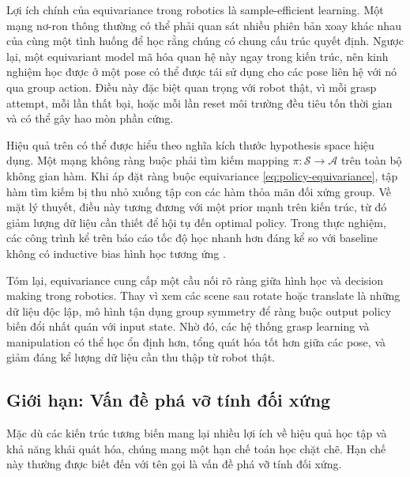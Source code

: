 
Lợi ích chính của equivariance trong robotics là sample-efficient learning. Một mạng nơ-ron thông thường có thể phải quan sát nhiều phiên bản xoay khác nhau của cùng một tình huống để học rằng chúng có chung cấu trúc quyết định. Ngược lại, một equivariant model mã hóa quan hệ này ngay trong kiến trúc, nên kinh nghiệm học được ở một pose có thể được tái sử dụng cho các pose liên hệ với nó qua group action. Điều này đặc biệt quan trọng với robot thật, vì mỗi grasp attempt, mỗi lần thất bại, hoặc mỗi lần reset môi trường đều tiêu tốn thời gian và có thể gây hao mòn phần cứng.

Hiệu quả trên có thể được hiểu theo nghĩa kích thước hypothesis space hiệu dụng. Một mạng không ràng buộc phải tìm kiếm mapping $\pi: \mathcal{S} \to \mathcal{A}$ trên toàn bộ không gian hàm. Khi áp đặt ràng buộc equivariance \eqref{eq:policy-equivariance}, tập hàm tìm kiếm bị thu nhỏ xuống tập con các hàm thỏa mãn đối xứng group. Về mặt lý thuyết, điều này tương đương với một prior mạnh trên kiến trúc, từ đó giảm lượng dữ liệu cần thiết để hội tụ đến optimal policy. Trong thực nghiệm, các công trình kể trên báo cáo tốc độ học nhanh hơn đáng kể so với baseline không có inductive bias hình học tương ứng \cite{wang2021equivariant, wang2022so2, zhu2023robot}.

Tóm lại, equivariance cung cấp một cầu nối rõ ràng giữa hình học và decision making trong robotics. Thay vì xem các scene sau rotate hoặc translate là những dữ liệu độc lập, mô hình tận dụng group symmetry để ràng buộc output policy biến đổi nhất quán với input state. Nhờ đó, các hệ thống grasp learning và manipulation có thể học ổn định hơn, tổng quát hóa tốt hơn giữa các pose, và giảm đáng kể lượng dữ liệu cần thu thập từ robot thật.

\subsection{Giới hạn: Vấn đề phá vỡ tính đối xứng}
\label{subsec:symmetry-breaking}

Mặc dù các kiến trúc tương biến mang lại nhiều lợi ích về hiệu quả học tập và khả năng khái quát hóa, chúng mang một hạn chế toán học chặt chẽ. Hạn chế này thường được biết đến với tên gọi là vấn đề phá vỡ tính đối xứng.

